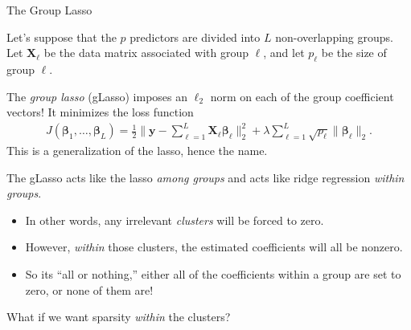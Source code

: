 \documentclass[8pt]{beamer}
\newcommand{\mydef}[1]{\textcolor{SteelBlue3}{\textit{#1}}} %
\begin{document}
\begin{frame}{The Group Lasso}

Let's suppose that the $p$ predictors are divided into $L$ non-overlapping groups. Let $\mathbf{X}_{\ell}$ be the data matrix associated with group $\ell$, and let $p_{\ell}$ be the size of group $\ell$. %

The \mydef{group lasso} (gLasso) \cite{yuan2006model} %
imposes an $\ell_2$ norm on each of the group coefficient vectors! It minimizes the loss function 
\begin{align*}
    J(\bm{\beta}_1,\ldots,\bm{\beta}_L) = \frac{1}{2} \| \mathbf{y}  - \sum_{\ell=1}^L \mathbf{X}_{\ell} \bm{\beta}_{\ell} \|_2^2 + \lambda \sum_{\ell=1}^L \sqrt{p_{\ell}} \| \bm{\beta}_{\ell} \|_2.
\end{align*} %
This is a generalization of the lasso, hence the name. %

The gLasso acts like the lasso \textit{among groups} and acts like ridge regression \textit{within groups}. %
\begin{itemize}
    \item In other words, any irrelevant \textit{clusters} will be forced to zero. %
    \item However, \textit{within} those clusters, the estimated coefficients will all be nonzero. %
    \item So its ``all or nothing,'' either all of the coefficients within a group are set to zero, or none of them are! %
\end{itemize}

What if we want sparsity \textit{within} the clusters? 
    
\end{frame}
\end{document}
